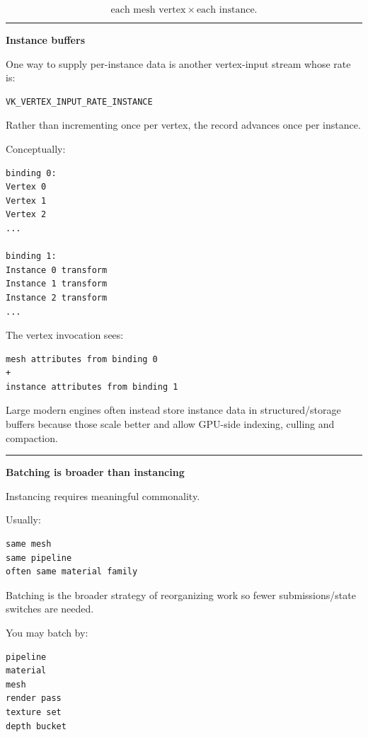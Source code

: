 \[
\text{each mesh vertex}
\times
\text{each instance}.
\]

\begin{center}\rule{0.5\linewidth}{0.5pt}\end{center}

\textbf{Instance buffers}

One way to supply per-instance data is another vertex-input stream whose rate is:

\begin{verbatim}
VK_VERTEX_INPUT_RATE_INSTANCE
\end{verbatim}

Rather than incrementing once per vertex, the record advances once per instance.

Conceptually:

\begin{verbatim}
binding 0:
Vertex 0
Vertex 1
Vertex 2
...

binding 1:
Instance 0 transform
Instance 1 transform
Instance 2 transform
...
\end{verbatim}

The vertex invocation sees:

\begin{verbatim}
mesh attributes from binding 0
+
instance attributes from binding 1
\end{verbatim}

Large modern engines often instead store instance data in structured/storage buffers because those scale better and allow GPU-side indexing, culling and compaction.

\begin{center}\rule{0.5\linewidth}{0.5pt}\end{center}

\textbf{Batching is broader than instancing}

Instancing requires meaningful commonality.

Usually:

\begin{verbatim}
same mesh
same pipeline
often same material family
\end{verbatim}

Batching is the broader strategy of reorganizing work so fewer submissions/state switches are needed.

You may batch by:

\begin{verbatim}
pipeline
material
mesh
render pass
texture set
depth bucket
\end{verbatim}

